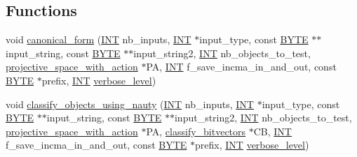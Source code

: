 \subsection*{Functions}
\begin{DoxyCompactItemize}
\item 
void \mbox{\hyperlink{projective__space__main_8_c_a5f0f6b71cd402c5b41240c420e533e60}{canonical\+\_\+form}} (\mbox{\hyperlink{galois_8h_a09fddde158a3a20bd2dcadb609de11dc}{I\+NT}} nb\+\_\+inputs, \mbox{\hyperlink{galois_8h_a09fddde158a3a20bd2dcadb609de11dc}{I\+NT}} $\ast$input\+\_\+type, const \mbox{\hyperlink{galois_8h_ab6cc7b4aeb6ea31aba2b3fbfc83ff5e6}{B\+Y\+TE}} $\ast$$\ast$input\+\_\+string, const \mbox{\hyperlink{galois_8h_ab6cc7b4aeb6ea31aba2b3fbfc83ff5e6}{B\+Y\+TE}} $\ast$$\ast$input\+\_\+string2, \mbox{\hyperlink{galois_8h_a09fddde158a3a20bd2dcadb609de11dc}{I\+NT}} nb\+\_\+objects\+\_\+to\+\_\+test, \mbox{\hyperlink{classprojective__space__with__action}{projective\+\_\+space\+\_\+with\+\_\+action}} $\ast$PA, \mbox{\hyperlink{galois_8h_a09fddde158a3a20bd2dcadb609de11dc}{I\+NT}} f\+\_\+save\+\_\+incma\+\_\+in\+\_\+and\+\_\+out, const \mbox{\hyperlink{galois_8h_ab6cc7b4aeb6ea31aba2b3fbfc83ff5e6}{B\+Y\+TE}} $\ast$prefix, \mbox{\hyperlink{galois_8h_a09fddde158a3a20bd2dcadb609de11dc}{I\+NT}} \mbox{\hyperlink{simeon_8_c_a818073fbcc2f439e7c56952f67386122}{verbose\+\_\+level}})
\item 
void \mbox{\hyperlink{projective__space__main_8_c_a32275eacc4bdda93b2b34c2a9217a088}{classify\+\_\+objects\+\_\+using\+\_\+nauty}} (\mbox{\hyperlink{galois_8h_a09fddde158a3a20bd2dcadb609de11dc}{I\+NT}} nb\+\_\+inputs, \mbox{\hyperlink{galois_8h_a09fddde158a3a20bd2dcadb609de11dc}{I\+NT}} $\ast$input\+\_\+type, const \mbox{\hyperlink{galois_8h_ab6cc7b4aeb6ea31aba2b3fbfc83ff5e6}{B\+Y\+TE}} $\ast$$\ast$input\+\_\+string, const \mbox{\hyperlink{galois_8h_ab6cc7b4aeb6ea31aba2b3fbfc83ff5e6}{B\+Y\+TE}} $\ast$$\ast$input\+\_\+string2, \mbox{\hyperlink{galois_8h_a09fddde158a3a20bd2dcadb609de11dc}{I\+NT}} nb\+\_\+objects\+\_\+to\+\_\+test, \mbox{\hyperlink{classprojective__space__with__action}{projective\+\_\+space\+\_\+with\+\_\+action}} $\ast$PA, \mbox{\hyperlink{classclassify__bitvectors}{classify\+\_\+bitvectors}} $\ast$CB, \mbox{\hyperlink{galois_8h_a09fddde158a3a20bd2dcadb609de11dc}{I\+NT}} f\+\_\+save\+\_\+incma\+\_\+in\+\_\+and\+\_\+out, const \mbox{\hyperlink{galois_8h_ab6cc7b4aeb6ea31aba2b3fbfc83ff5e6}{B\+Y\+TE}} $\ast$prefix, \mbox{\hyperlink{galois_8h_a09fddde158a3a20bd2dcadb609de11dc}{I\+NT}} \mbox{\hyperlink{simeon_8_c_a818073fbcc2f439e7c56952f67386122}{verbose\+\_\+level}})

\end{DoxyCompactItemize}
